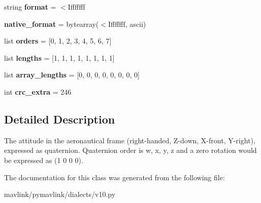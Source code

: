 \begin{DoxyCompactItemize}
string {\bfseries format} = \textquotesingle{}$<$Ifffffff\textquotesingle{}
\item 
\mbox{\label{classpymavlink_1_1dialects_1_1v10_1_1MAVLink__attitude__quaternion__message_aa84eed7cde0fe080afa0e3191887dcea}} 
{\bfseries native\+\_\+format} = bytearray(\textquotesingle{}$<$Ifffffff\textquotesingle{}, \textquotesingle{}ascii\textquotesingle{})
\item 
\mbox{\label{classpymavlink_1_1dialects_1_1v10_1_1MAVLink__attitude__quaternion__message_a5fe6ab2ea4d6d61d6b018b2ac970ad5f}} 
list {\bfseries orders} = \mbox{[}0, 1, 2, 3, 4, 5, 6, 7\mbox{]}
\item 
\mbox{\label{classpymavlink_1_1dialects_1_1v10_1_1MAVLink__attitude__quaternion__message_a9d8ae8d22269de18c2b0c254808fa259}} 
list {\bfseries lengths} = \mbox{[}1, 1, 1, 1, 1, 1, 1, 1\mbox{]}
\item 
\mbox{\label{classpymavlink_1_1dialects_1_1v10_1_1MAVLink__attitude__quaternion__message_a946504979118839ddebee3a156a0a39e}} 
list {\bfseries array\+\_\+lengths} = \mbox{[}0, 0, 0, 0, 0, 0, 0, 0\mbox{]}
\item 
\mbox{\label{classpymavlink_1_1dialects_1_1v10_1_1MAVLink__attitude__quaternion__message_aba29fc646255ef788a62c780582a575b}} 
int {\bfseries crc\+\_\+extra} = 246
\end{DoxyCompactItemize}


\subsection{Detailed Description}
\begin{DoxyVerb}The attitude in the aeronautical frame (right-handed, Z-down,
X-front, Y-right), expressed as quaternion. Quaternion order
is w, x, y, z and a zero rotation would be expressed as (1 0 0
0).
\end{DoxyVerb}
 

The documentation for this class was generated from the following file\+:\begin{DoxyCompactItemize}
\item 
mavlink/pymavlink/dialects/v10.\+py\end{DoxyCompactItemize}
